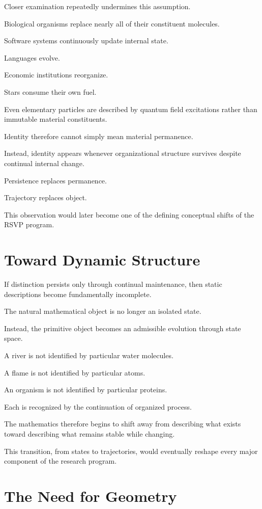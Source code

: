 \documentclass[11pt,oneside]{book}
\numberwithin{equation}{chapter}
\theoremstyle{definition}
\theoremstyle{plain}
\begin{document}
Closer examination repeatedly undermines this assumption.

Biological organisms replace nearly all of their constituent molecules.

Software systems continuously update internal state.

Languages evolve.

Economic institutions reorganize.

Stars consume their own fuel.

Even elementary particles are described by quantum field excitations rather
than immutable material constituents.

Identity therefore cannot simply mean material permanence.

Instead, identity appears whenever organizational structure survives despite
continual internal change.

Persistence replaces permanence.

Trajectory replaces object.

This observation would later become one of the defining conceptual shifts of
the RSVP program.

\section{Toward Dynamic Structure}

If distinction persists only through continual maintenance, then static
descriptions become fundamentally incomplete.

The natural mathematical object is no longer an isolated state.

Instead, the primitive object becomes an admissible evolution through state
space.

A river is not identified by particular water molecules.

A flame is not identified by particular atoms.

An organism is not identified by particular proteins.

Each is recognized by the continuation of organized process.

The mathematics therefore begins to shift away from describing what exists
toward describing what remains stable while changing.

This transition, from states to trajectories, would eventually reshape every
major component of the research program.

\section{The Need for Geometry}
\end{document}
